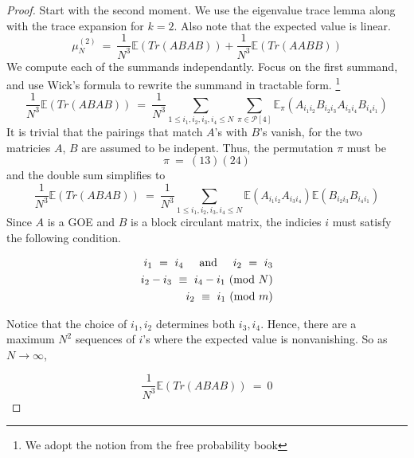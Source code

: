 \documentclass[12pt,reqno]{amsart}
\theoremstyle{plain} %
\theoremstyle{remark}
\theoremstyle{definition}
\renewcommand{\mod}[1]{\textup{ (mod~$#1$)}}
\begin{document}
\begin{proof}
    Start with the second moment. 
    We use the eigenvalue trace lemma along with the trace expansion 
    for $k = 2$. Also note that the expected value is linear. 
\begin{equation}
    \label{eqn:secondGOEBC}
    \mu_N^{(2)} \ = \ \frac 1 {N^{3}} \mathbb{E}(Tr(ABAB)) + \frac 1 {N^3}\mathbb{E}(Tr(AABB))
\end{equation}
We compute each of the summands independantly. Focus on the first 
summand, and use Wick's formula to rewrite the summand in tractable 
form. \footnote{We adopt the notion from the free probability book}
\begin{equation}
    \frac 1 {N^{3}} \mathbb{E}(Tr(ABAB)) \
    =  \
    \frac 1 {N^3} 
    \sum_{1 \leq i_1, i_2, i_3, i_4 \leq N} 
    \sum_{\pi \in \mathcal{P}[4]}
    \mathbb{E}_\pi (
        A_{i_1i_2}B_{i_2i_3}A_{i_3i_4}B_{i_4i_1}
    )
\end{equation}
It is trivial that the pairings that match $A$'s with $B$'s 
vanish, for the two matricies $A$, $B$ are assumed to be indepent. 
Thus, the permutation $\pi$ must be 
\[
    \pi \ = \ (13)(24)
\]
and the double sum simplifies to 
\begin{equation}
    \frac 1 {N^{3}} \mathbb{E}(Tr(ABAB)) \
    =  \
    \frac 1 {N^3} 
    \sum_{1 \leq i_1, i_2, i_3, i_4 \leq N}
    \mathbb{E} (
        A_{i_1i_2}A_{i_3i_4}
    )
\mathbb{E} (
        B_{i_2i_3}B_{i_4i_1}
    )
\end{equation}
Since $A$ is a GOE and $B$ is a block circulant matrix, the indicies $i$ must 
satisfy the following condition. 

\begin{eqnarray}
    i_1 \ = \ i_4 \textAnd i_2 \ = \ i_3 \\
    i_2 - i_3 \ \equiv \ i_4 - i_1 \mod N \\
    i_2 \ \equiv \ i_1 \mod m
\end{eqnarray}

Notice that the choice of $i_1, i_2$ determines both $i_3, i_4$. Hence, 
there are a maximum $N^2$ sequences of $i$'s where the expected value 
is nonvanishing. So as $N \rightarrow \infty$, 

\begin{equation}
    \frac 1 {N^{3}} \mathbb{E}(Tr(ABAB)) \
    =  \ 0
\end{equation}


\end{proof}
\end{document}
